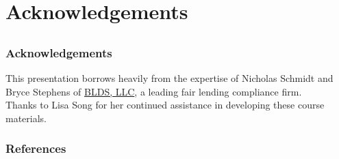 \documentclass[11pt,aspectratio=169,hyperref={colorlinks}]{beamer}
\begin{document}
	\section{Acknowledgements}

	\subsection*{}
	
	\begin{frame}
	
		\frametitle{Acknowledgements}
		
		This presentation borrows heavily from the expertise of Nicholas Schmidt and Bryce Stephens of \href{https://www.bldsllc.com/}{BLDS, LLC}, a leading fair lending compliance firm.\\
		\vspace{10pt}		
		Thanks to Lisa Song for her continued assistance in developing these course materials. 

	\end{frame}	
	

	\begin{frame}[t, allowframebreaks]
	
		\frametitle{References}
		\printbibliography
		
	\end{frame}
\end{document}
